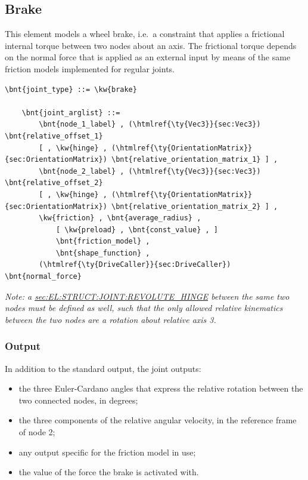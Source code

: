 \subsection{Brake}
This element models a wheel brake, i.e.\ a constraint that applies
a frictional internal torque between two nodes about an axis.
The frictional torque depends on the normal force that is applied 
as an external input by means of the same friction models implemented
for regular joints.
\begin{Verbatim}[commandchars=\\\{\}]
    \bnt{joint_type} ::= \kw{brake}

    \bnt{joint_arglist} ::= 
        \bnt{node_1_label} , (\htmlref{\ty{Vec3}}{sec:Vec3}) \bnt{relative_offset_1} 
        [ , \kw{hinge} , (\htmlref{\ty{OrientationMatrix}}{sec:OrientationMatrix}) \bnt{relative_orientation_matrix_1} ] ,
        \bnt{node_2_label} , (\htmlref{\ty{Vec3}}{sec:Vec3}) \bnt{relative_offset_2}
        [ , \kw{hinge} , (\htmlref{\ty{OrientationMatrix}}{sec:OrientationMatrix}) \bnt{relative_orientation_matrix_2} ] ,
        \kw{friction} , \bnt{average_radius} , 
            [ \kw{preload} , \bnt{const_value} , ]
            \bnt{friction_model} , 
            \bnt{shape_function} ,
        (\htmlref{\ty{DriveCaller}}{sec:DriveCaller}) \bnt{normal_force}
\end{Verbatim}
\emph{Note: a
\hyperref{\kw{revolute hinge}}{\kw{revolute hinge} (see Section~}{)}{sec:EL:STRUCT:JOINT:REVOLUTE_HINGE}
between the same two nodes must be defined as well, such that
the only allowed relative kinematics between the two nodes are
a rotation about relative axis 3.
}

\subsubsection{Output}
In addition to the standard output, the  joint outputs:
\begin{itemize}
\item the three Euler-Cardano angles that express the relative rotation
	between the two connected nodes, in degrees;
\item the three components of the relative angular velocity,
	in the reference frame of node 2;
\item any output specific for the friction model in use;
\item the value of the force the brake is activated with.
\end{itemize}

